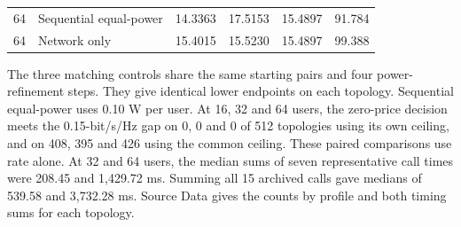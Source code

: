 \begin{table}[htbp]
\begin{tabular}{llllll}
64 & Sequential equal-power & 14.3363 & 17.5153 & 15.4897 & 91.784\\
64 & Network only & 15.4015 & 15.5230 & 15.4897 & 99.388\\
\bottomrule\end{tabular}
\par\medskip\begin{minipage}{\linewidth}\small
The three matching controls share the same starting pairs and four power-refinement steps. They give identical lower endpoints on each topology. Sequential equal-power uses 0.10 W per user. At 16, 32 and 64 users, the zero-price decision meets the 0.15-bit/s/Hz gap on 0, 0 and 0 of 512 topologies using its own ceiling, and on 408, 395 and 426 using the common ceiling. These paired comparisons use rate alone. At 32 and 64 users, the median sums of seven representative call times were 208.45 and 1,429.72 ms. Summing all 15 archived calls gave medians of 539.58 and 3,732.28 ms. Source Data gives the counts by profile and both timing sums for each topology.
\end{minipage}
\end{table}
